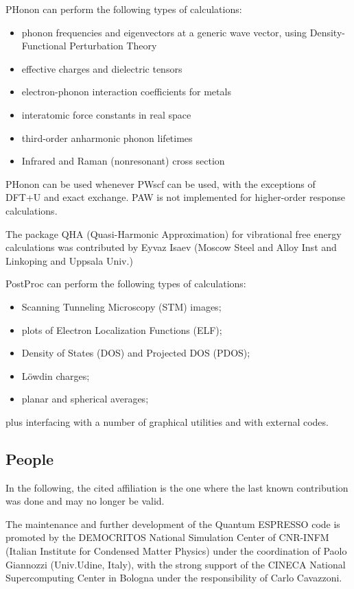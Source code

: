 \documentclass[12pt,a4paper]{article}
\begin{document}
PHonon can perform the following types of calculations:
\begin{itemize}
  \item phonon frequencies and eigenvectors at a generic wave vector,
  using Density-Functional Perturbation Theory
  \item effective charges and dielectric tensors
  \item electron-phonon interaction coefficients for metals
  \item interatomic force constants in real space
  \item third-order anharmonic phonon lifetimes
  \item Infrared and Raman (nonresonant) cross section
\end{itemize}
PHonon can be used whenever PWscf can be used, with the exceptions of
DFT+U and exact exchange. PAW is not implemented for higher-order 
response calculations.

The package QHA (Quasi-Harmonic Approximation) for vibrational
free energy calculations
was contributed by Eyvaz Isaev (Moscow Steel and Alloy Inst and
Linkoping and Uppsala Univ.)

PostProc can perform the following types of calculations:
\begin{itemize}
  \item Scanning Tunneling Microscopy (STM) images;
  \item plots of Electron Localization Functions (ELF);
  \item Density of States (DOS) and Projected DOS (PDOS);
  \item L\"owdin charges;
  \item planar and spherical averages;
\end{itemize}
plus interfacing with a number of graphical utilities and with 
external codes.

\subsection{People}

In the following, the cited affiliation is the one where the last known 
contribution was done and may no longer be valid.

The maintenance and further development of the Quantum ESPRESSO code
is promoted by the DEMOCRITOS National Simulation Center 
of CNR-INFM
(Italian Institute for Condensed Matter Physics) under the 
coordination of
Paolo Giannozzi (Univ.Udine, Italy), with the strong support
of the CINECA National Supercomputing Center in Bologna under 
the responsibility of Carlo Cavazzoni.
     
\end{document}
